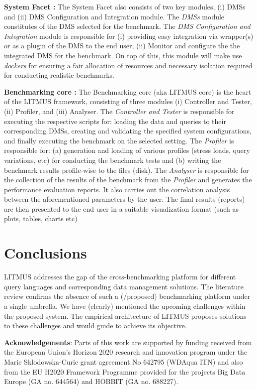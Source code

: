 \documentclass{llncs}
\newcommand{\todoproofread}[3]{
    \todoitemtemplate{#1}{#2}{Please proof read above section; #3}{inline}{yellow}
}
\newcommand{\todoitemtemplate}[5]{%
\todo[#4,color=#5,caption=X]{{#1}{ \textbf{{\tiny{for}} #2}:}{#3}}%
}
\begin{document}
        \textbf{System Facet :} The System Facet also consists of two key modules, (i) DMSs and (ii) DMS Configuration and Integration module. The \textit{DMSs} module  constitutes of the DMS selected for the benchmark. The \textit{DMS Configuration and Integration} module is responsible for (i) providing easy integration via wrapper(s) or as a plugin of the DMS to the end user, (ii) Monitor and configure the the integrated DMS for the benchmark. On top of this, this module will make use \textit{dockers} for ensuring a fair allocation of resources and necessary isolation required for conducting realistic benchmarks. 
        
        \textbf{Benchmarking core :} The Benchmarking core (aka LITMUS core) is the heart of the LITMUS framework, consisting of three modules (i) Controller and Tester, (ii) Profiler, and (iii) Analyser. The \textit{Controller and Tester} is responsible for executing the respective scripts for: loading the data and queries to their corresponding DMSs, creating and validating the specified system configurations, and finally executing the benchmark on the selected setting. The \textit{Profiler} is responsible for: (a) generation and loading of various profiles (stress loads, query variations, etc) for conducting the benchmark tests and (b) writing the benchmark results profile-wise to the files (disk). The \textit{Analyser} is responsible for the collection of the results of the benchmark from the \textit{Profiler} and generates the performance evaluation reports. It also carries out the correlation analysis between the aforementioned  parameters by the user. The final results (reports) are then presented to the end user in a suitable visualization format (such as plots, tables, charts etc)
    
\section{Conclusions} 
LITMUS addresses the gap of the cross-benchmarking platform for different query languages and corresponding data management solutions. 
The literature review confirms the absence of such a (/proposed)  benchmarking platform under a single umbrella. 
We have (clearly) mentioned the upcoming challenges within the proposed system.
The empirical architecture of LITMUS proposes solutions to these challenges and would guide to achieve its objective.

\textbf{Acknowledgements}: Parts of this work are supported by funding received from the European Union's Horizon 2020 research and innovation program under the Marie Sklodowska-Curie grant agreement No 642795 (WDAqua ITN) and also from the EU H2020 Framework Programme provided for the projects Big Data Europe (GA no. 644564) and HOBBIT (GA no. 688227).



\end{document}
